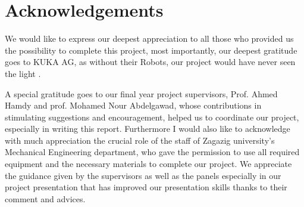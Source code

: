 \documentclass{report}
\begin{document}
	

\clearpage
\thispagestyle{plain}
\par\vspace*{.35\textheight}{\centering In memory of Ahmed Emam\par}


\newpage
	
	
	
\chapter*{Acknowledgements}


We would like to express our deepest appreciation to all those who provided us the possibility to complete this project, most importantly, our deepest gratitude goes to KUKA AG, as without their Robots, our project would have never seen the light .  

A special gratitude goes to our final year project  supervisors, Prof. Ahmed Hamdy and prof. Mohamed Nour Abdelgawad, whose contributions in stimulating suggestions and encouragement,  helped us to coordinate our project, especially in writing this report.
Furthermore I would also like to acknowledge with much appreciation the crucial role of the staff of Zagazig university’s Mechanical Engineering department, who gave the permission to use all required  equipment and the necessary materials to complete our project. We appreciate the guidance given by the supervisors as well as the panels especially in our project presentation that has improved our presentation skills thanks to their comment and advices.

	
	
\end{document}
